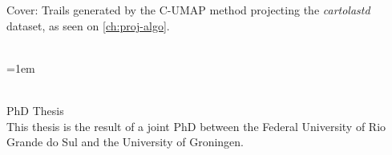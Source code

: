 \thispagestyle{empty}

\hyphenation{}

\null
\vfill

\noindent Cover: Trails generated by the C-UMAP method projecting the \emph{cartolastd} dataset, as seen on \cref{ch:proj-algo}.
\vspace{1.5cm}

\noindent\myTitle\\
\hangindent=1em

\noindent \myName\\
PhD Thesis\\

\vspace{1.5cm}
\noindent This thesis is the result of a joint PhD between the Federal University of Rio Grande do Sul and the University of Groningen. \\

\vspace{1.5cm}


